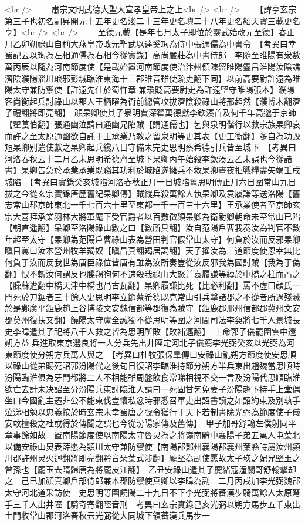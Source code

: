 <br />
　　肅宗文明武德大聖大宣孝皇帝上之上<br />
<br />
　　【諱亨玄宗第三子也初名嗣昇開元十五年更名浚二十三年更名璵二十八年更名紹天寶三載更名亨】<br />
<br />
　　至德元載【是年七月太子即位於靈武始改元至德】春正月乙卯朔祿山自稱大燕皇帝改元聖武以達奚珣為侍中張通儒為中書令　【考異曰幸蜀記云以珣為左相通儒為右相今從實錄】高尚嚴莊為中書侍郎　李隨至睢陽有衆數萬丙辰以隨為河南節度使【是載始置河南節度使治汴州領陳留睢陽靈昌淮陽汝陰譙濟陰濮陽淄川琅邪彭城臨淮東海十三郡睢音雖使疏吏翻下同】以前高要尉許遠為睢陽太守兼防禦使【許遠先仕於蜀忤章兼瓊貶高要尉史為許遠堅守睢陽張本】濮陽客尚衡起兵討祿山以郡人王栖曜為衙前總管攻拔濟陰殺祿山將邢超然【濮博木翻濟子禮翻將即亮翻】　顔杲卿使其子泉明賈深翟萬德獻李欽湊首及何千年高邈于京師【翟萇伯翻】張通幽泣請曰通幽兄陷賊【謂通儒也】乞與泉明偕行以救宗族杲卿哀而許之至太原通幽欲自託于王承業乃教之留泉明等更其表【更工衡翻】多自為功毁短杲卿别遣使獻之杲卿起兵纔八日守備未完史思明蔡希德引兵皆至城下　【考異曰河洛春秋云十二月乙未思明希德齊至城下杲卿丙午始殺李欽湊云乙未誤也今從諸書】杲卿告急於承業承業既竊其功利於城陷遂擁兵不救杲卿晝夜拒戰糧盡矢竭壬戌城陷　【考異曰實錄癸亥城陷河洛春秋正月一日城陷舊思明傳正月六日圍常山九日拔之今從玄宗實錄唐歷舊紀杲卿傳】賊縱兵殺萬餘人執杲卿及袁履謙等送洛陽【舊志常山郡京師東北一千七百六十里至東都一千一百三十六里】王承業使者至京師玄宗大喜拜承業羽林大將軍麾下受官爵者以百數徵顔杲卿為衛尉卿朝命未至常山已陷【朝直遥翻】杲卿至洛陽祿山數之曰【數所具翻】汝自范陽戶曹我奏汝為判官不數年超至太守【杲卿為范陽戶曹祿山表為營田判官假常山太守】何負於汝而反邪杲卿瞋目罵曰汝本營州牧羊羯奴【瞋昌真翻羯居謁翻】天子擢汝為三道節度使恩幸無比何負于汝而反我世為唐臣祿位皆唐有雖為汝所奏豈從汝反邪我為國討賊【我為于偽翻】恨不斬汝何謂反也臊羯狗何不速殺我祿山大怒并袁履謙等縳於中橋之柱而冎之【臊蘇遭翻中橋天津中橋也冎古瓦翻】杲卿履謙比死【比必利翻】罵不虛口顔氏一門死於刀鋸者三十餘人史思明李立節蔡希德既克常山引兵撃諸郡之不從者所過殘滅於是鄴廣平鉅鹿趙上谷博陵文安魏信都等郡復為賊守【鉅鹿郡邢州信都郡冀州文安郡莫州復扶又翻】饒陽太守盧全誠獨不從思明等圍之河間司法李奐將七千人景城長史李暐遣其子祀將八千人救之皆為思明所敗【敗補邁翻】　上命郭子儀罷圍雲中還朔方益兵進取東京選良將一人分兵先出井陘定河北子儀薦李光弼癸亥以光弼為河東節度使分朔方兵萬人與之　【考異曰杜牧張保臯傳曰安祿山亂朔方節度使安思順以祿山從弟賜死詔郭汾陽代之後旬日復詔李臨淮持節分朔方半兵東出趙魏當思順時汾陽臨淮俱為牙門都將二人不相能雖周盤飲食常睇相視不交一言及汾陽代思順臨淮欲亡去計未决詔至分汾陽兵東討臨淮入請曰一死固甘乞免妻子汾陽趨下持手上堂偶坐曰今國亂主遷非公不能東伐豈懷私忿時邪悉召軍吏出詔書讀之如詔約束及别執手泣涕相勉以忠義按於時玄宗未幸蜀唐之號令猶行于天下若制書除光弼為節度使子儀安敢擅殺之杜或得於傳聞之誤也今從汾陽家傳及舊傳】　甲子加哥舒翰左僕射同平章事餘如故　置南陽節度使以南陽太守魯炅為之將嶺南黔中襄陽子弟五萬人屯葉北以備安祿山炅表薛愿為潁川太守兼防禦使【南陽郡鄧州襄陽郡襄州葉縣時屬汝州潁川郡許州炅火迥翻將即亮翻黔音琹葉式涉翻】龎堅為副使愿故太子瑛之妃兄堅玉之曾孫也【龎玉去隋歸唐為將龎皮江翻】　乙丑安祿山遣其子慶緒寇潼關哥舒翰擊却之　己巳加顔真卿戶部侍郎兼本郡防禦使真卿以李暐為副　二月丙戌加李光弼魏郡太守河北道采訪使　史思明等圍饒陽二十九日不下李光弼將蕃漢步騎萬餘人太原弩手三千人出井陘【騎奇寄翻陘音刑　考異曰玄宗實錄己亥光弼以朔方馬步五千東出土門收常山郡河洛春秋云光弼從大同城下領蕃漢兵馬步一